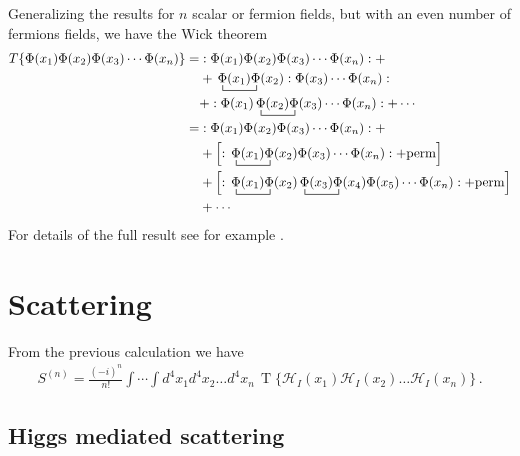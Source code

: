   


 Generalizing  the results for $n$ scalar or fermion fields, but with an even number of fermions fields, we have the Wick theorem
\begin{align}
  T\{\Phi(x_1)\Phi(x_2)\Phi(x_3)\cdots\Phi(x_n) \}
=&:\Phi(x_1)\Phi(x_2)\Phi(x_3)\cdots\Phi(x_n):+\nonumber\\
&+\bcontraction{\,}{\Phi}{(x_1)}{\Phi}\,\Phi(x_1)\Phi(x_2):\Phi(x_3)\cdots\Phi(x_n):\nonumber\\
&+:\Phi(x_1)\bcontraction{\,}{\Phi}{(x_2)}{\Phi}\,\Phi(x_2)\Phi(x_3)\cdots\Phi(x_n):+\cdots  \nonumber\\
=&:\Phi(x_1)\Phi(x_2)\Phi(x_3)\cdots\Phi(x_n):+\nonumber\\
&+\left[:\bcontraction{\,}{\Phi}{(x_1)}{\Phi}\,\Phi(x_1)\Phi(x_2)\Phi(x_3)\cdots\Phi(x_n): +\text{perm} \right]\nonumber\\
&+\left[  :\bcontraction{\,}{\Phi}{(x_1)}{\Phi}\,\Phi(x_1)\Phi(x_2) \bcontraction{\,}{\Phi}{(x_3)}{\Phi}\,\Phi(x_3)\Phi(x_4)\Phi(x_5)\cdots\Phi(x_n): +\text{perm}  \right] \nonumber\\
&+\cdots \nonumber\\
\end{align}
For details of the full result see for example \cite{Lahiri:2005sm}.


\section{Scattering}
\label{sec:scattering}
From the previous calculation we have
\begin{align}
S^{(n)}=  \frac{(-i)^n}{n!}\int\cdots\int d^4x_1 d^4x_2\ldots d^4x_n\,\operatorname{T}\{\mathcal{H}_I(x_1)\mathcal{H}_I(x_2)\ldots\mathcal{H}_I(x_n)\}\,.
\end{align}

\subsection{Higgs mediated scattering}
\label{sec:higgs-medi-scatt}

